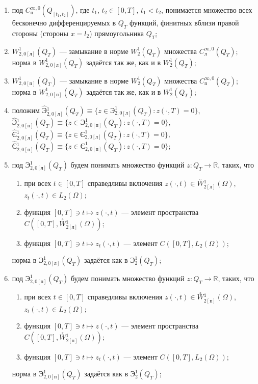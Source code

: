 \documentclass{report}
\begin{document}
{\begin{enumerate}
    \item
под $C^{\infty,0}_{\textrm{п}}(Q_{[t_1,t_2]})$, где $t_1$, $t_2\in[0,T]$, $t_1<t_2$, понимается множество всех бесконечно дифференцируемых в $Q_T$
функций, финитных вблизи правой стороны (стороны $x=l_2$) прямоугольника $Q_T$;

    \item
$W^1_{2,0[\textrm{л}]}(Q_T)$ --- замыкание в норме $W^1_2(Q_T)$ множества $C^{\infty,0}_{\textrm{л}}(Q_T)$; норма в $W^1_{2,0[\textrm{л}]}(Q_T)$ задаётся так же, как и в $W^1_2(Q_T)$;

    \item
$W^1_{2,0[\textrm{п}]}(Q_T)$ --- замыкание в норме $W^1_2(Q_T)$ множества $C^{\infty,0}_{\textrm{п}}(Q_T)$; норма в $W^1_{2,0[\textrm{п}]}(Q_T)$ задаётся так же, как и в $W^1_2(Q_T)$;

    \item
положим $\hat{\textrm{Э}}{}^1_{2,0[\textrm{л}]}(Q_T)\equiv\{z\in \textrm{Э}^1_{2,0[\textrm{л}]}(Q_T):z(\cdot,T)=0\}$,
$\hat{\textrm{Э}}{}^1_{2,0[\textrm{п}]}(Q_T)\equiv\{z\in \textrm{Э}^1_{2,0[\textrm{п}]}(Q_T): z(\cdot,T)=0\}$,
$\hat{\textrm{Є}}{}^1_{2,0[\textrm{л}]}(Q_T)\equiv\{z\in \textrm{Є}^1_{2,0[\textrm{л}]}(Q_T):z(\cdot,T)=0\}$,
$\hat{\textrm{Є}}{}^1_{2,0[\textrm{п}]}(Q_T)\equiv\{z\in \textrm{Є}^1_{2,0[\textrm{п}]}(Q_T):z(\cdot,T)=0\}$;

    \item
под $\textbf{Э}^1_{2,0[\textrm{л}]}(Q_T)$ будем понимать множество функций $z:Q_T\to\mathbb{R}$, таких, что
\begin{enumerate}
    \item
при всех $t\in[0,T]$ справедливы включения $z(\cdot,t)\in\stackrel{\circ}{W}\!\!^1_{2[\textrm{л}]}(\Omega)$, $z_t(\cdot,t)\in L_2(\Omega)$;
    \item
функция $[0,T]\ni t\mapsto z(\cdot,t)$ --- элемент пространства $C([0,T],\stackrel{\circ}{W}\!\!^1_{2[\textrm{л}]}(\Omega))$;
    \item
функция  $[0,T]\ni t\mapsto z_t(\cdot,t)$ --- элемент $C([0,T],L_2(\Omega))$;
\end{enumerate}
норма в  $\textbf{Э}^1_{2,0[\textrm{л}]}(Q_T)$ задаётся как в $\textbf{Э}^1_{2}(Q_T)$;

    \item
под $\textbf{Э}^1_{2,0[\textrm{п}]}(Q_T)$ будем понимать множество функций $z:Q_T\to\mathbb{R}$, таких, что
\begin{enumerate}
    \item
при всех $t\in[0,T]$ справедливы включения $z(\cdot,t)\in\stackrel{\circ}{W}\!\!^1_{2[\textrm{п}]}(\Omega)$, $z_t(\cdot,t)\in L_2(\Omega)$;
    \item
функция $[0,T]\ni t\mapsto z(\cdot,t)$ --- элемент пространства $C([0,T],\stackrel{\circ}{W}\!\!^1_{2[\textrm{п}]}(\Omega))$;
    \item
функция  $[0,T]\ni t\mapsto z_t(\cdot,t)$ --- элемент $C([0,T],L_2(\Omega))$;
\end{enumerate}
норма в  $\textbf{Э}^1_{2,0[\textrm{п}]}(Q_T)$ задаётся как в $\textbf{Э}^1_{2}(Q_T)$;


\end{enumerate}}
\end{document}
